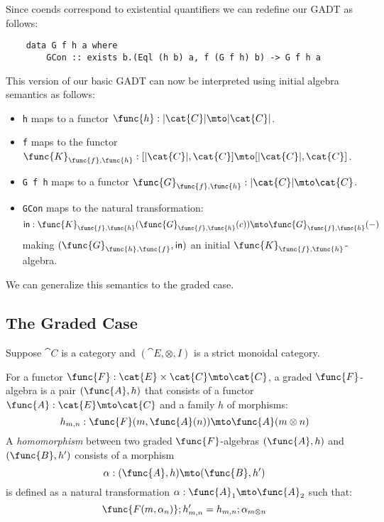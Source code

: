 Since coends correspond to existential quantifiers we can redefine our
GADT as follows:
\begin{verbatim}
    data G f h a where
        GCon :: exists b.(Eql (h b) a, f (G f h) b) -> G f h a
\end{verbatim}
This version of our basic GADT can now be interpreted using initial
algebra semantics as follows:
\begin{itemize}
    \item \verb!h! maps to a functor $\func{h} : |\cat{C}| \mto
    |\cat{C}|$. 

    \item \verb!f! maps to the functor $\func{K}_{\func{f},\func{h}} : [|\cat{C}|,\cat{C}]
    \mto [|\cat{C}|, \cat{C}]$.    

    \item \verb!G f h! maps to a functor 
          $\func{G}_{\func{f},\func{h}} : |\cat{C}| \mto \cat{C}$.

    \item \verb!GCon! maps to the natural transformation:
          \[
            \mathsf{in} : 
            \func{K}_{\func{f},\func{h}}(\func{G}_{\func{f},\func{h}}(c))
            \mto 
            \func{G}_{\func{f},\func{h}}(-)
          \]
          making $(\func{G}_{\func{h},\func{f}},\mathsf{in})$ an
          initial $\func{K}_{\func{f},\func{h}}$-algebra.
\end{itemize}
We can generalize this semantics to the graded case.

\subsection{The Graded Case}
\label{subsec:the_graded_case}

Suppose $\cat{C}$ is a category and $(\cat{E},\otimes,I)$ is a strict
monoidal category.

\begin{definition}
    For a functor $\func{F} : \cat{E} \times \cat{C} \mto \cat{C}$, a
    graded $\func{F}$-algebra is a pair $(\func{A},h)$ that consists
    of a functor $\func{A} : \cat{E} \mto \cat{C}$ and a family $h$ of
    morphisms:
    \[ 
        h_{m,n} : \func{F}(m,\func{A}(n)) \mto \func{A}(m \otimes n)
    \]
    A \emph{homomorphism} between two graded $\func{F}$-algebras
    $(\func{A},h)$ and $(\func{B},h')$ consists of a morphism
    \[
        \alpha : (\func{A},h) \mto (\func{B},h')
    \]
    is defined as a natural transformation $\alpha : \func{A}_1 \mto
    \func{A}_2$ such that:
    \[
        \func{F(m,\alpha_n)} ; h'_{m,n} = h_{m,n} ; \alpha_{m \otimes n}
    \]
\end{definition}

